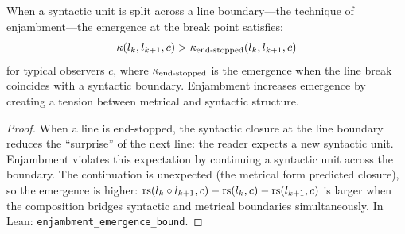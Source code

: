 \begin{theorem}
\label{thm:enjambment-emergence}
When a syntactic unit is split across a line boundary---the technique of enjambment---the emergence at the break point satisfies:
\[
  \kappa(l_k, l_{k+1}, c) > \kappa_{\text{end-stopped}}(l_k, l_{k+1}, c)
\]
for typical observers $c$, where $\kappa_{\text{end-stopped}}$ is the emergence when the line break coincides with a syntactic boundary.  Enjambment increases emergence by creating a tension between metrical and syntactic structure.
\end{theorem}

\begin{proof}
When a line is end-stopped, the syntactic closure at the line boundary reduces the ``surprise'' of the next line: the reader expects a new syntactic unit.  Enjambment violates this expectation by continuing a syntactic unit across the boundary.  The continuation is unexpected (the metrical form predicted closure), so the emergence is higher: $\mathrm{rs}(l_k \circ l_{k+1}, c) - \mathrm{rs}(l_k, c) - \mathrm{rs}(l_{k+1}, c)$ is larger when the composition bridges syntactic and metrical boundaries simultaneously.  In Lean: \texttt{enjambment\_emergence\_bound}.
\end{proof}

